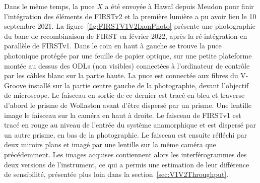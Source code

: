 Dans le même temps, la puce $X$ a été envoyée à Hawaï depuis Meudon pour finir l'intégration des éléments de \ac{FIRSTv2} et la première lumière a pu avoir lieu le 10 septembre 2021. La figure~\ref{fig:FIRSTV1V2IxonPhoto} présente une photographie du banc de recombinaison de \ac{FIRST} en février 2022, après la ré-intégration en parallèle de \ac{FIRSTv1}. Dans le coin en haut à gauche se trouve la puce photonique protégée par une feuille de papier optique, sur une petite plateforme montée au dessus des \ac{ODL}s (non visibles) connectées à l'ordinateur de contrôle par les câbles blanc sur la partie haute. La puce est connectée aux fibres du V-Groove installé sur la partie centre gauche de la photographie, devant l'objectif de microscope. Le faisceau en sortie de ce dernier est tracé en bleu et traverse d'abord le prisme de Wollaston avant d'être dispersé par un prisme. Une lentille image le faisceau sur la caméra en haut à droite. Le faisceau de \ac{FIRSTv1} est tracé en rouge au niveau de l'entrée du système anamorphique et est dispersé par un autre prisme, en bas de la photographie. Le faisceau est ensuite réfléchi par deux miroirs plans et imagé par une lentille sur la même caméra que précédemment. Les images acquises contiennent alors les interférogrammes des deux versions de l'instrument, ce qui a permis une estimation de leur différence de sensibilité, présentée plus loin dans la section~\ref{sec:V1V2Throughput}.

